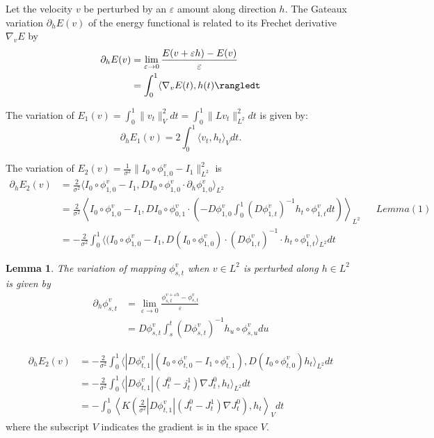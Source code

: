 \documentclass{article}
\theoremstyle{definition}
\theoremstyle{plain}
\newtheorem{lemma}{Lemma}
\begin{document}
Let the velocity $v$ be perturbed by an $\varepsilon$ amount along direction $h$. The Gateaux variation $\partial_hE(v)$ of the energy functional is related to its Frechet derivative $\nabla_vE$ by
\begin{align*}
    \partial_hE(v)&=\lim_{\varepsilon\rightarrow 0}\frac{E(v+\varepsilon h)-E(v)}{\varepsilon}\\
    &=\int^1_0\langle\nabla_vE(t),h(t)\rangledt
\end{align*}

The variation of $E_1(v)=\int^1_0\|v_t\|^2_Vdt=\int^1_0\|Lv_t\|^2_{L^2}dt$ is given by:
\begin{equation*}
    \partial_hE_1(v)=2\int^1_0\langle v_t,h_t\rangle_Vdt.
\end{equation*}

The variation of $E_2(v)=\frac{1}{\sigma^2}\|I_0\circ\phi^v_{1,0}-I_1\|^2_{L^2}$ is
\begin{align*}
    \partial_hE_2(v)&=\frac{2}{\sigma^2}\langle I_0\circ\phi^v_{1,0}-I_1,DI_0\circ\phi^v_{1,0}\cdot\partial_h\phi^v_{1,0}\rangle_{L^2}\\
    &=\frac{2}{\sigma^2}\left< I_0\circ\phi^v_{1,0}-I_1,DI_0\circ\phi^v_{0,1}\cdot\left(-D\phi^v_{1,0}\int^1_0(D\phi^v_{1,t})^{-1}h_t\circ\phi^v_{1,t}dt\right)\right>_{L^2} &&Lemma (1)\\
    &=-\frac{2}{\sigma^2}\int^1_0\langle(I_0\circ\phi^v_{1,0}-I_1,D(I_0\circ\phi^v_{1,0})\cdot(D\phi^v_{1,t})^{-1}\cdot h_t\circ\phi^v_{1,t}\rangle_{L^2}dt
\end{align*}
\begin{lemma}
The variation of mapping $\phi^v_{s,t}$ when $v\in L^2$ is perturbed along $h\in L^2$ is given by
\begin{align*}
    \partial_h\phi^v_{s,t}&=\lim_{\varepsilon\rightarrow0}\frac{\phi^{v+\varepsilon h}_{s,t}-\phi^v_{s,t}}{\varepsilon}\\
    &=D\phi^v_{s,t}\int^t_s(D\phi^v_{s,t})^{-1}h_u\circ\phi^v_{s,u}du
\end{align*}
\end{lemma}
\begin{align*}
    \partial_hE_2(v)&=-\frac{2}{\sigma^2}\int^1_0\langle|D\phi^v_{t,1}|(I_0\circ\phi^v_{t,0}-I_1\circ\phi^v_{t,1}),D(I_0\circ\phi^v_{t,0})h_t\rangle_{L^2}dt\\
    &=-\frac{2}{\sigma^2}\int^1_0\langle|D\phi^v_{t,1}|(J^0_t-j^1_t)\nabla J^0_t,h_t\rangle_{L^2}dt\\
    &=-\int^1_0\left< K\left(\frac{2}{\sigma^2}|D\phi^v_{t,1}|(J^0_t-J^1_t)\nabla J^0_t\right),h_t\right>_Vdt
\end{align*}
where the subscript $V$ indicates the gradient is in the space $V$.
\end{document}
